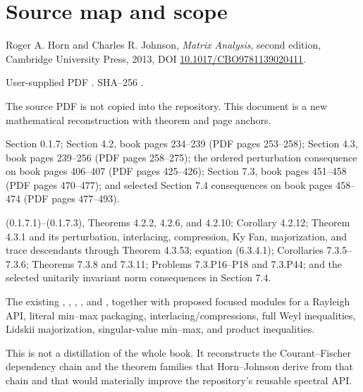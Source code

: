 \section*{Source map and scope}
\begin{sourceguide}
\item[Primary source] Roger A. Horn and Charles R. Johnson, \emph{Matrix Analysis}, second edition, Cambridge University Press, 2013, DOI \href{https://doi.org/10.1017/CBO9781139020411}{10.1017/CBO9781139020411}.
\item[Local evidence] User-supplied PDF . SHA--256 \texttt{}.
\item[Redistribution] The source PDF is not copied into the repository. This document is a new mathematical reconstruction with theorem and page anchors.
\item[Primary coverage] Section 0.1.7; Section 4.2, book pages 234--239 (PDF pages 253--258); Section 4.3, book pages 239--256 (PDF pages 258--275); the ordered perturbation consequence on book pages 406--407 (PDF pages 425--426); Section 7.3, book pages 451--458 (PDF pages 470--477); and selected Section 7.4 consequences on book pages 458--474 (PDF pages 477--493).
\item[Core anchors] (0.1.7.1)--(0.1.7.3), Theorems 4.2.2, 4.2.6, and 4.2.10; Corollary 4.2.12; Theorem 4.3.1 and its perturbation, interlacing, compression, Ky Fan, majorization, and trace descendants through Theorem 4.3.53; equation (6.3.4.1); Corollaries 7.3.5--7.3.6; Theorems 7.3.8 and 7.3.11; Problems 7.3.P16--P18 and 7.3.P44; and the selected unitarily invariant norm consequences in Section 7.4.
\item[Formalization target] The existing , , , , and , together with proposed focused modules for a Rayleigh API, literal min--max packaging, interlacing/compressions, full Weyl inequalities, Lidskii majorization, singular-value min--max, and product inequalities.
\item[Scope boundary] This is not a distillation of the whole book. It reconstructs the Courant--Fischer dependency chain and the theorem families that Horn--Johnson derive from that chain and that would materially improve the repository's reusable spectral API.
\end{sourceguide}

